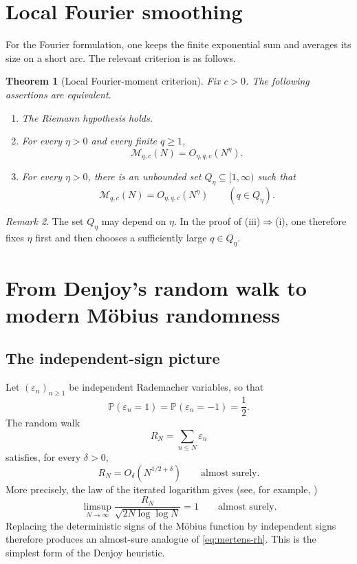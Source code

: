 \documentclass[11pt]{article}
\newtheorem{theorem}{Theorem}[section]
\theoremstyle{remark}
\newtheorem{remark}[theorem]{Remark}
\newcommand{\Pp}{\mathbb P}
\newcommand{\Mcal}{\mathcal M}
\begin{document}
\section{Local Fourier smoothing}

For the Fourier formulation, one keeps the finite exponential sum and averages its size on a short arc.  The relevant criterion is as follows.

\begin{theorem}[Local Fourier-moment criterion]\label{thm:fourier}
Fix \(c>0\).  The following assertions are equivalent.
\begin{enumerate}[label=\textup{(\roman*)}]
\item The Riemann hypothesis holds.
\item For every \(\eta>0\) and every finite \(q\ge1\),
\[
\Mcal_{q,c}(N)=O_{\eta,q,c}(N^\eta).
\]
\item For every \(\eta>0\), there is an unbounded set
\(Q_\eta\subseteq[1,\infty)\) such that
\[
\Mcal_{q,c}(N)=O_{\eta,q,c}(N^\eta)
\qquad(q\in Q_\eta).
\]
\end{enumerate}
\end{theorem}

\begin{remark}\label{rem:iii-precise}
The set \(Q_\eta\) may depend on \(\eta\).  In the proof of
\textup{(iii)}\(\Rightarrow\)\textup{(i)}, one therefore fixes
\(\eta\) first and then chooses a sufficiently large
\(q\in Q_\eta\).
\end{remark}


\section{From Denjoy's random walk to modern M\texorpdfstring{\"o}{o}bius randomness}
\label{sec:modern-randomness}

\subsection{The independent-sign picture}

Let \((\varepsilon_n)_{n\geq1}\) be independent Rademacher variables,
so that
\[
 \Pp(\varepsilon_n=1)=\Pp(\varepsilon_n=-1)=\frac12.
\]
The random walk
\[
 R_N=\sum_{n\leq N}\varepsilon_n
\]
satisfies, for every \(\delta>0\),
\[
 R_N=O_\delta(N^{1/2+\delta})
 \qquad\text{almost surely}.
\]
More precisely, the law of the iterated logarithm gives
(see, for example, \cite{Kahane})
\[
 \limsup_{N\to\infty}
 \frac{R_N}{\sqrt{2N\log\log N}}=1
 \qquad\text{almost surely}.
\]
Replacing the deterministic signs of the M\"obius function by
independent signs therefore produces an almost-sure analogue of
\eqref{eq:mertens-rh}.  This is the simplest form of the Denjoy
heuristic.
\end{document}

